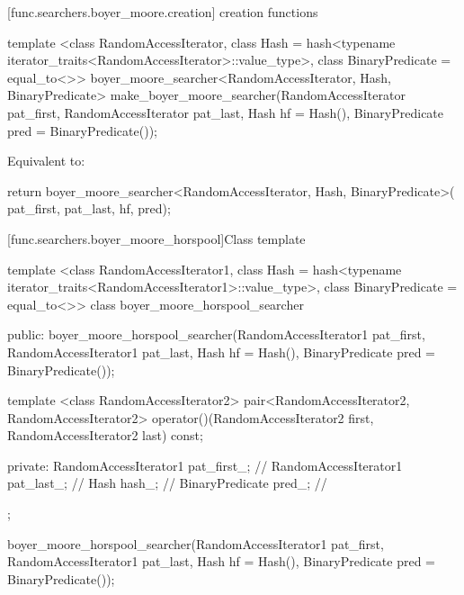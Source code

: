 [func.searchers.boyer_moore.creation]{ creation functions}

%
\begin{itemdecl}
template <class RandomAccessIterator,
          class Hash = hash<typename iterator_traits<RandomAccessIterator>::value_type>,
          class BinaryPredicate = equal_to<>>
  boyer_moore_searcher<RandomAccessIterator, Hash, BinaryPredicate>
    make_boyer_moore_searcher(RandomAccessIterator pat_first,
                              RandomAccessIterator pat_last, Hash hf = Hash(),
                              BinaryPredicate pred = BinaryPredicate());
\end{itemdecl}

\begin{itemdescr}
\pnum
\effects
Equivalent to:
\begin{codeblock}
return boyer_moore_searcher<RandomAccessIterator, Hash, BinaryPredicate>(
         pat_first, pat_last, hf, pred);
\end{codeblock}
\end{itemdescr}

[func.searchers.boyer_moore_horspool]{Class template }

%
\begin{codeblock}
template <class RandomAccessIterator1,
          class Hash = hash<typename iterator_traits<RandomAccessIterator1>::value_type>,
          class BinaryPredicate = equal_to<>>
class boyer_moore_horspool_searcher {
public:
  boyer_moore_horspool_searcher(RandomAccessIterator1 pat_first,
                                RandomAccessIterator1 pat_last,
                                Hash hf = Hash(),
                                BinaryPredicate pred = BinaryPredicate());

  template <class RandomAccessIterator2>
    pair<RandomAccessIterator2, RandomAccessIterator2>
      operator()(RandomAccessIterator2 first,
                 RandomAccessIterator2 last) const;

private:
  RandomAccessIterator1 pat_first_; // \expos
  RandomAccessIterator1 pat_last_;  // \expos
  Hash hash_;                       // \expos
  BinaryPredicate pred_;            // \expos
};
\end{codeblock}

%
\begin{itemdecl}
boyer_moore_horspool_searcher(RandomAccessIterator1 pat_first,
                              RandomAccessIterator1 pat_last, Hash hf = Hash(),
                              BinaryPredicate pred = BinaryPredicate());
\end{itemdecl}

